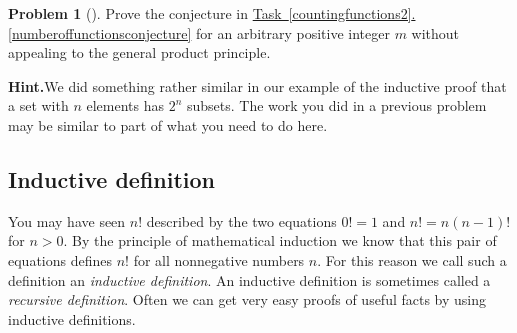 \documentclass[10pt,]{book}
\theoremstyle{plain}
\theoremstyle{definition}
\newtheorem{activity}[project]{Problem}
\theoremstyle{definition}
\numberwithin{equation}{chapter}
\begin{document}
\begin{activity}[]\label{altproofnumberoffunctionsconjecture}
Prove the conjecture in \hyperref[numberoffunctionsconjecture]{Task~\ref{countingfunctions2}.\ref{numberoffunctionsconjecture}} for an arbitrary positive integer \(m\) without appealing to the general product principle.%
\par\medskip\noindent%
\textbf{Hint.}\quad We did something rather similar in our example of the inductive proof that a set with \(n\) elements has \(2^n\) subsets. The work you did in a previous problem may be similar to part of what you need to do here.%
\end{activity}
\typeout{************************************************}
\typeout{************************************************}
\subsection[{Inductive definition}]{Inductive definition}\label{subsection-7}
You may have seen \(n!\) described by the two equations \(0!=1\) and \(n!=n(n-1)!\) for \(n>0\). By the principle of mathematical induction we know that this pair of equations defines \(n!\) for all nonnegative numbers \(n\). For this reason we call such a definition an \emph{inductive definition}. An inductive definition is sometimes called a \emph{recursive definition}. Often we can get very easy proofs of useful facts by using inductive definitions.%
\end{document}
